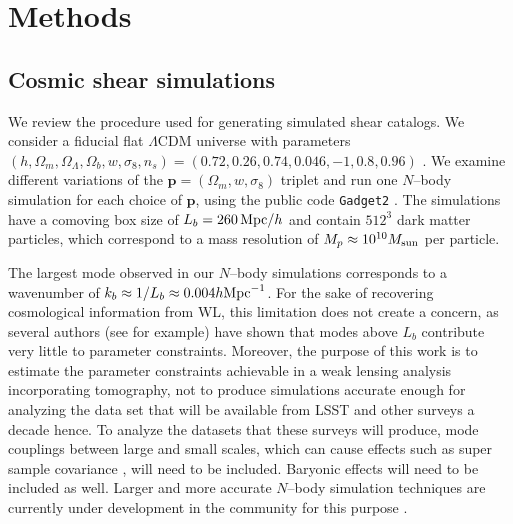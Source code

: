 \documentclass[reprint,aps,prd,superscriptaddress,showkeys,showpacs]{revtex4-1}
\newcommand{\bb}[1]{\mathbf{#1}}
\newcommand{\ttt}[1]{\texttt{#1}}
\begin{document}

\section{Methods}
\label{sec:methods}


\subsection{Cosmic shear simulations}
\label{sec:shearsim}
We review the procedure used for generating simulated shear catalogs. We consider a fiducial flat $\Lambda$CDM universe with parameters $(h,\Omega_m,\Omega_\Lambda,\Omega_b,w,\sigma_8,n_s)=(0.72,0.26,0.74,0.046,-1,0.8,0.96)$ \citep{WMAP9,PlanckCosmo}. We examine different variations of the $\bb{p}=(\Omega_m,w,\sigma_8)$ triplet and run one $N$--body simulation for each choice of $\bb{p}$, using the public code \ttt{Gadget2} \citep{Gadget2}. The simulations have a comoving box size of $L_b=260\,{\rm Mpc}/h$ and contain $512^3$ dark matter particles, which correspond to a mass resolution of $M_p\approx 10^{10}M_{\rm sun}$ per particle. 

The largest mode observed in our $N$--body simulations corresponds to a wavenumber of $k_b\approx1/L_b\approx 0.004 h{\rm Mpc}^{-1}$. For the sake of recovering cosmological information from WL, this limitation does not create a concern, as several authors (see \citep{FangHaiman07} for example) have shown that modes above $L_b$ contribute very little to parameter constraints. 
Moreover, the purpose of this work is to estimate the parameter constraints achievable in a weak lensing analysis incorporating tomography, not to produce simulations accurate enough for analyzing the data set that will be available from LSST and other surveys a decade hence. To analyze the datasets that these surveys will produce, mode couplings between large and small scales, which can cause effects such as super sample covariance \citep{Sato12,SSC1,SSC2}, will need to be included. Baryonic effects will need to be included as well. Larger and more accurate $N$--body simulation techniques are currently under development in the community for this purpose \citep{Qcontinuum,HACC}.
\end{document}
